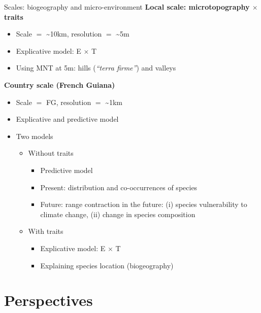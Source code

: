 \documentclass[
  10pt,
  ignorenonframetext,
  table, dvipsname, compress]{beamer}
\providecommand{\tightlist}{%
  \setlength{\itemsep}{0pt}\setlength{\parskip}{0pt}}
\begin{document}
\begin{frame}{Scales: biogeography and micro-environment}
\protect\hypertarget{scales-biogeography-and-micro-environment}{}
\textbf{Local scale: microtopography \(\times\) traits}

\begin{itemize}
\tightlist
\item
  Scale \(=\) \textasciitilde10km, resolution \(=\) \textasciitilde5m
\item
  Explicative model: E \(\times\) T
\item
  Using MNT at 5m: hills (\emph{``terra firme''}) and valleys
\end{itemize}

\textbf{Country scale (French Guiana)}

\begin{itemize}
\tightlist
\item
  Scale \(=\) FG, resolution \(=\) \textasciitilde1km
\item
  Explicative and predictive model
\item
  Two models

  \begin{itemize}
  \tightlist
  \item
    Without traits

    \begin{itemize}
    \tightlist
    \item
      Predictive model
    \item
      Present: distribution and co-occurrences of species
    \item
      Future: range contraction in the future: (i) species vulnerability
      to climate change, (ii) change in species composition
    \end{itemize}
  \item
    With traits

    \begin{itemize}
    \tightlist
    \item
      Explicative model: E \(\times\) T
    \item
      Explaining species location (biogeography)
    \end{itemize}
  \end{itemize}
\end{itemize}
\end{frame}

\hypertarget{perspectives}{%
\section{Perspectives}\label{perspectives}}
\end{document}
